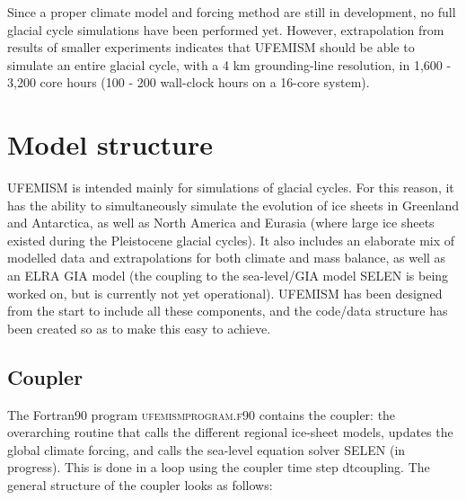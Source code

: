 \documentclass{article}
\begin{document}
Since a proper climate model and forcing method are still in development, no full glacial cycle simulations have been performed yet. However, extrapolation from results of smaller experiments indicates that UFEMISM should be able to simulate an entire glacial cycle, with a 4 km grounding-line resolution, in 1,600 - 3,200 core hours (100 - 200 wall-clock hours on a 16-core system).

\newpage
\section{Model structure}

UFEMISM is intended mainly for simulations of glacial cycles. For this reason, it has the ability to simultaneously simulate the evolution of ice sheets in Greenland and Antarctica, as well as North America and Eurasia (where large ice sheets existed during the Pleistocene glacial cycles). It also includes an elaborate mix of modelled data and extrapolations for both climate and mass balance, as well as an ELRA GIA model (the coupling to the sea-level/GIA model SELEN is being worked on, but is currently not yet operational). UFEMISM has been designed from the start to include all these components, and the code/data structure has been created so as to make this easy to achieve.

\subsection{Coupler}

The Fortran90 program \textsc{ufemism\textunderscore program.f90} contains the coupler: the overarching routine that calls the different regional ice-sheet models, updates the global climate forcing, and calls the sea-level equation solver SELEN (in progress). This is done in a loop using the coupler time step dt\textunderscore coupling. The general structure of the coupler looks as follows:
\end{document}
